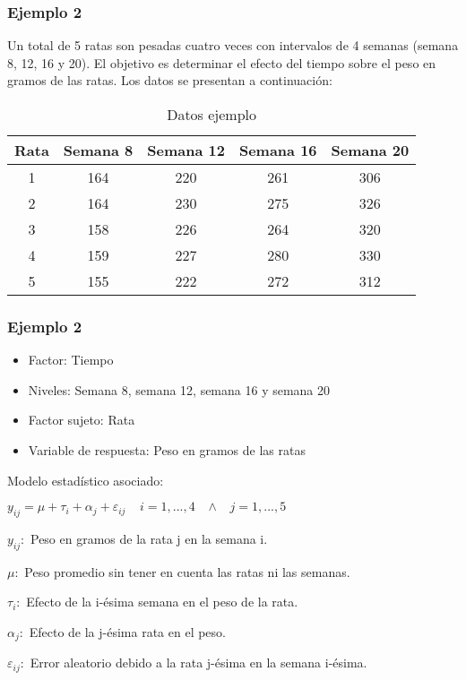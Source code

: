 \documentclass[12pt]{beamer}
\begin{document}
\begin{frame}
\frametitle{Ejemplo 2}
Un total de 5 ratas son pesadas cuatro veces con intervalos de 4 semanas (semana 8, 12, 16 y 20). El objetivo es determinar el efecto del tiempo sobre el peso en gramos de las ratas. Los datos se presentan a continuación:
\begin{table}[htbp]
  \centering
\resizebox{12cm}{!} {
\begin{tabular}{|c|c|c|c|c|}
\hline 
\textbf{Rata} & \textbf{Semana 8} & \textbf{Semana 12} & \textbf{Semana 16} & \textbf{Semana 20}\\ 
\hline 
1 & 164 &220& 261& 306\\
2 & 164 &230& 275& 326\\
3 &158 &226& 264& 320\\
4 &159 &227& 280& 330\\
5 &155 &222 &272& 312\\
\hline 
\end{tabular} 
}
\caption{Datos ejemplo}
\label{tab:addlabel}%
\end{table}%
\end{frame}

\begin{frame}
\frametitle{Ejemplo 2}
\begin{itemize}
\item Factor: Tiempo
\item Niveles: Semana 8, semana 12, semana 16 y semana 20
\item Factor sujeto: Rata
\item Variable de respuesta: Peso en gramos de las ratas
\end{itemize}
Modelo estadístico asociado:
\begin{center}
$y_{ij}=\mu+\tau_i+\alpha_j+\varepsilon_{ij} \;\;\;\; i=1,...,4 \;\;\;  \wedge \;\;\; j=1,...,5$
\end{center}
$y_{ij}:$ Peso en gramos de la rata j en la semana i.

$\mu:$ Peso promedio sin tener en cuenta las ratas ni las semanas.

$\tau_i:$ Efecto de la i-ésima semana en el peso de la rata.

$\alpha_j:$ Efecto de la j-ésima rata en el peso.

$\varepsilon_{ij}:$ Error aleatorio debido a la rata j-ésima en la semana i-ésima.

\end{frame}
\end{document}
